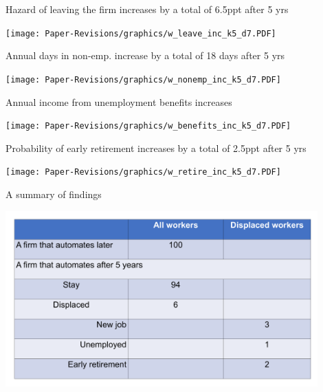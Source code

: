 \documentclass[aspectratio=169]{beamer}
\begin{document}
\begin{frame}{Hazard of leaving the firm increases by a total of 6.5ppt after 5 yrs} \label{leave}
\noindent \begin{center}
	\texttt{[image: Paper-Revisions/graphics/w\_leave\_inc\_k5\_d7.PDF]}
	\end{center}
\end{frame}

\begin{frame}{Annual days in non-emp. increase by a total of 18 days after 5 yrs} \label{nonemp}
\noindent \begin{center}
	\texttt{[image: Paper-Revisions/graphics/w\_nonemp\_inc\_k5\_d7.PDF]}
	\end{center}
\end{frame}

\begin{frame}{Annual income from unemployment benefits increases} \label{benefits_split}
\noindent \begin{center}
	\texttt{[image: Paper-Revisions/graphics/w\_benefits\_inc\_k5\_d7.PDF]}
		\end{center}
\end{frame}

\begin{frame}{Probability of early retirement increases by a total of 2.5ppt after 5 yrs}
\noindent \begin{center}
	\texttt{[image: Paper-Revisions/graphics/w\_retire\_inc\_k5\_d7.PDF]}
    \end{center}
\end{frame}

\begin{frame}{A summary of findings}
\noindent \begin{center}
	\includegraphics[width=0.9\textwidth]{figures/summary-crop.pdf}
    \end{center}
\end{frame}
\end{document}
